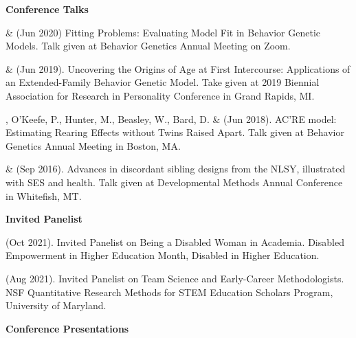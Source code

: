 {\large {\bf Conference Talks}}\begin{etaremune}
\item \meb \& \Joe (Jun 2020) Fitting Problems: Evaluating Model Fit in Behavior Genetic Models. Talk given at Behavior Genetics Annual Meeting on Zoom.
%
\item \meb \& \Joe (Jun 2019). Uncovering the Origins of Age at First Intercourse: Applications of an Extended-Family Behavior Genetic Model. Take given at 2019 Biennial Association for Research in Personality Conference in Grand Rapids, MI.
%
\item\meb, O'Keefe, P., Hunter, M., Beasley, W., Bard, D. \& \Joe (Jun 2018). AC'RE model: Estimating Rearing Effects without Twins Raised Apart. Talk given at Behavior Genetics Annual Meeting in Boston, MA.
%
\item\meb \& \joe (Sep 2016). Advances in discordant sibling designs from the NLSY, illustrated with SES and health. Talk given at Developmental Methods Annual Conference in Whitefish, MT.%
%
\end{etaremune}
{\large \bf Invited Panelist}
\begin{etaremune}
%
\item \meb (Oct 2021). Invited Panelist on Being a Disabled Woman in Academia. Disabled Empowerment in Higher Education Month, Disabled in Higher Education.
%
\item \meb (Aug 2021). Invited Panelist on Team Science and Early-Career Methodologists. NSF Quantitative Research Methods for STEM Education Scholars Program, University of Maryland.\medskip\\
\end{etaremune}
{\large {\bf Conference Presentations}}
